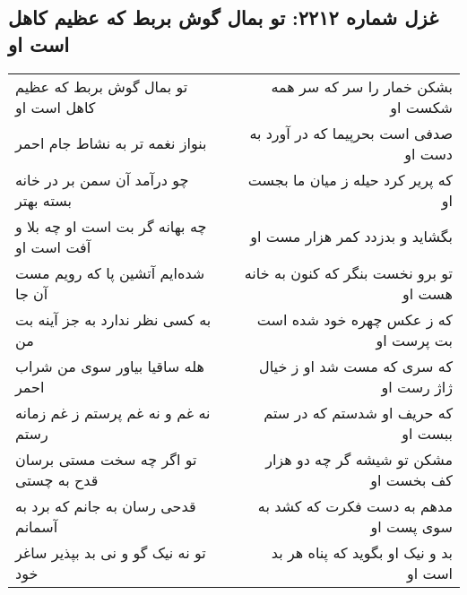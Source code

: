 \begin{center}
\section*{غزل شماره ۲۲۱۲: تو بمال گوش بربط که عظیم کاهل است او}
\label{sec:2212}
\begin{longtable}{l p{0.5cm} r}
تو بمال گوش بربط که عظیم کاهل است او
&&
بشکن خمار را سر که سر همه شکست او
\\
بنواز نغمه تر به نشاط جام احمر
&&
صدفی است بحرپیما که در آورد به دست او
\\
چو درآمد آن سمن بر در خانه بسته بهتر
&&
که پریر کرد حیله ز میان ما بجست او
\\
چه بهانه گر بت است او چه بلا و آفت است او
&&
بگشاید و بدزدد کمر هزار مست او
\\
شده‌ایم آتشین پا که رویم مست آن جا
&&
تو برو نخست بنگر که کنون به خانه هست او
\\
به کسی نظر ندارد به جز آینه بت من
&&
که ز عکس چهره خود شده است بت پرست او
\\
هله ساقیا بیاور سوی من شراب احمر
&&
که سری که مست شد او ز خیال ژاژ رست او
\\
نه غم و نه غم پرستم ز غم زمانه رستم
&&
که حریف او شدستم که در ستم ببست او
\\
تو اگر چه سخت مستی برسان قدح به چستی
&&
مشکن تو شیشه گر چه دو هزار کف بخست او
\\
قدحی رسان به جانم که برد به آسمانم
&&
مدهم به دست فکرت که کشد به سوی پست او
\\
تو نه نیک گو و نی بد بپذیر ساغر خود
&&
بد و نیک او بگوید که پناه هر بد است او
\\
\end{longtable}
\end{center}
